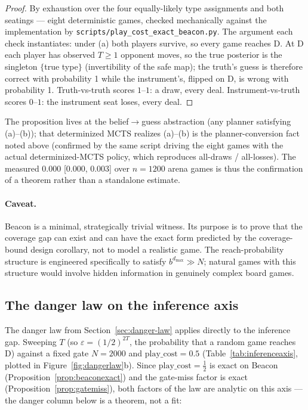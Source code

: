\documentclass[11pt]{article}
\theoremstyle{remark}
\newcommand{\dmax}{d_{\max}}
\begin{document}
\begin{proof}
By exhaustion over the four equally-likely type assignments and both seatings --- eight deterministic games, checked mechanically against the implementation by \texttt{scripts/\allowbreak play\_\allowbreak cost\_\allowbreak exact\_\allowbreak beacon.py}. The argument each check instantiates: under (a) both players survive, so every game reaches D. At D each player has observed $T \geq 1$ opponent moves, so the true posterior is the singleton $\{$true type$\}$ (invertibility of the safe map); the truth's guess is therefore correct with probability 1 while the instrument's, flipped on D, is wrong with probability 1. Truth-vs-truth scores $1$--$1$: a draw, every deal. Instrument-vs-truth scores $0$--$1$: the instrument seat loses, every deal.
\end{proof}

The proposition lives at the belief$\to$guess abstraction (any planner satisfying (a)--(b)); that determinized MCTS realizes (a)--(b) is the planner-conversion fact noted above (confirmed by the same script driving the eight games with the actual determinized-MCTS policy, which reproduces all-draws / all-losses). The measured 0.000 [0.000, 0.003] over $n = 1200$ arena games is thus the confirmation of a theorem rather than a standalone estimate.

\paragraph{Caveat.} Beacon is a minimal, strategically trivial witness. Its purpose is to prove that the coverage gap can exist and can have the exact form predicted by the coverage-bound design corollary, not to model a realistic game. The reach-probability structure is engineered specifically to satisfy $b^{\dmax} \gg N$; natural games with this structure would involve hidden information in genuinely complex board games.

\subsection{The danger law on the inference axis}

The danger law from Section~\ref{sec:danger-law} applies directly to the inference gap. Sweeping $T$ (so $\varepsilon = (1/2)^{2T}$, the probability that a random game reaches D) against a fixed gate $N = 2000$ and $\mathrm{play\_cost} = 0.5$ (Table~\ref{tab:inferenceaxis}, plotted in Figure~\ref{fig:dangerlaw}b). Since $\mathrm{play\_cost} = \tfrac12$ is exact on Beacon (Proposition~\ref{prop:beaconexact}) and the gate-miss factor is exact (Proposition~\ref{prop:gatemiss}), both factors of the law are analytic on this axis --- the danger column below is a theorem, not a fit:
\end{document}

